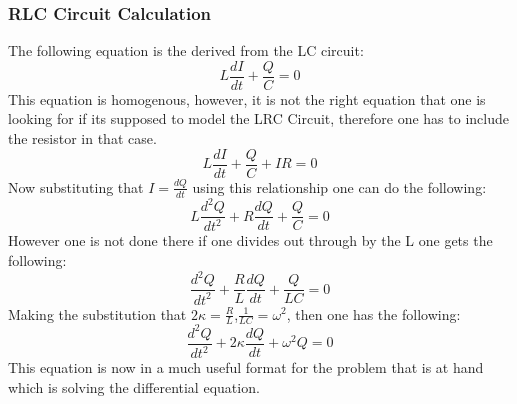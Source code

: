 \documentclass[11pt]{article} %
\begin{document}
\subsubsection{RLC Circuit Calculation}
The following equation is the derived from the LC circuit: \begin{equation} L\frac{dI}{dt}+\frac{Q}{C}=0\end{equation} This equation is homogenous, however, it is not the right equation that one is looking for if its supposed to model the LRC Circuit, therefore one has to include the resistor in that case.
\begin{equation}L\frac{dI}{dt}+\frac{Q}{C}+IR=0 \end{equation} Now substituting that $I=\frac{dQ}{dt}$ using this relationship one can do the following: \begin{equation}L\frac{d^2Q}{dt^2}+R\frac{dQ}{dt}+\frac{Q}{C}=0 \end{equation}
However one is not done there if one divides out through by the L one gets the following: \begin{equation*}\frac{d^2Q}{dt^2}+\frac{R}{L}\frac{dQ}{dt}+\frac{Q}{LC}=0 \end{equation*} Making the substitution that $2\kappa = \frac{R}{L}$,$\frac{1}{LC}=\omega^2$, then one has the following: \begin{equation}\frac{d^2Q}{dt^2}+2\kappa\frac{dQ}{dt}+\omega^2{Q} =0\end{equation} This equation is now in a much useful format for the problem that is at hand which is solving the differential equation.
\newpage
\end{document}
